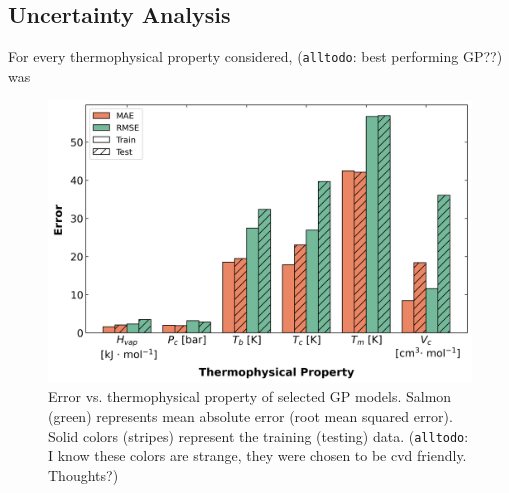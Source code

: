 \documentclass[journal=jacsat,manuscript=article]{achemso}
\newcommand{\alltodo}[1]{{\color{Cyan} (\texttt{alltodo}: #1)}}
\begin{document}
\subsection{Uncertainty Analysis}
For every thermophysical property considered, \alltodo{best performing GP??} was
\begin{figure}
    \centering
    \includegraphics[width=0.75\linewidth]{images/error_bar_chart.png}
    \caption{Error vs. thermophysical property of selected GP models. Salmon (green) represents mean absolute error (root mean squared error). Solid colors (stripes) represent the training (testing) data. \alltodo{I know these colors are strange, they were chosen to be cvd friendly. Thoughts?}}
    \label{fig:enter-label}
\end{figure}
\end{document}
